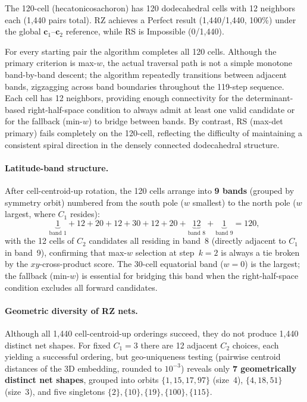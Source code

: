 \documentclass[12pt]{article}
\theoremstyle{definition}
\begin{document}
The 120-cell (hecatonicosachoron) has 120 dodecahedral cells with
12 neighbors each (1,440 pairs total).
RZ achieves a Perfect result (1,440/1,440, 100\%) under the global
$\mathbf{c}_1$--$\mathbf{c}_2$ reference, while RS is Impossible (0/1,440).

For every starting pair the algorithm completes all 120 cells.
Although the primary criterion is max-$w$, the actual traversal path
is not a simple monotone band-by-band descent; the algorithm
repeatedly transitions between adjacent bands, zigzagging across
band boundaries throughout the 119-step sequence.
Each cell has 12 neighbors, providing enough connectivity for the
determinant-based right-half-space condition to always admit at least
one valid candidate or for the fallback (min-$w$) to bridge between
bands.
By contrast, RS (max-det primary) fails completely on the 120-cell,
reflecting the difficulty of maintaining a consistent spiral direction
in the densely connected dodecahedral structure.

\paragraph{Latitude-band structure.}
After cell-centroid-up rotation, the 120 cells arrange into
\textbf{9 bands} (grouped by symmetry orbit) numbered from the south
pole ($w$ smallest) to the north pole ($w$ largest, where $C_1$ resides):
\[
  \underbrace{1}_{\text{band 1}} + 12 + 20 + 12 + 30 + 12 + 20 +
  \underbrace{12}_{\text{band 8}} +
  \underbrace{1}_{\text{band 9}} = 120,
\]
with the 12 cells of $C_2$ candidates all residing in band~8
(directly adjacent to $C_1$ in band~9),
confirming that max-$w$ selection at step~$k=2$
is always a tie broken by the $xy$-cross-product score.
The 30-cell equatorial band ($w=0$) is the largest; the fallback
(min-$w$) is essential for bridging this band when the right-half-space
condition excludes all forward candidates.

\paragraph{Geometric diversity of RZ nets.}
Although all 1,440 cell-centroid-up orderings succeed, they do not
produce 1,440 distinct net shapes.
For fixed $C_1=3$ there are 12 adjacent $C_2$ choices, each yielding
a successful ordering, but geo-uniqueness testing
(pairwise centroid distances of the 3D embedding, rounded to $10^{-3}$)
reveals only \textbf{7 geometrically distinct net shapes}, grouped into
orbits $\{1,15,17,97\}$ (size~4), $\{4,18,51\}$ (size~3), and five
singletons $\{2\},\{10\},\{19\},\{100\},\{115\}$.
\end{document}
